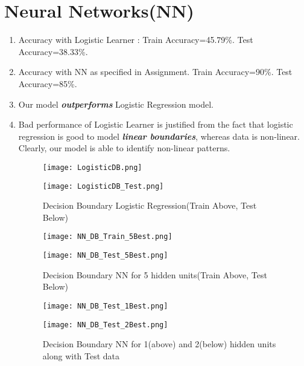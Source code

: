 \documentclass{article}
\newcommand{\italb}[1]{\textbf{\textit{#1}}}
\begin{document}
\section*{Neural Networks(NN)}
\begin{enumerate}
	\item Accuracy with Logistic Learner : Train Accuracy=45.79\%. Test Accuracy=38.33\%.
	\item Accuracy with NN as specified in Assignment. Train Accuracy=90\%. Test Accuracy=85\%.
	\item Our model \italb{outperforms} Logistic Regression model. 
	\item Bad performance of Logistic Learner is justified from the fact that logistic regression is good to model \italb{linear boundaries}, whereas data is non-linear. Clearly, our model is able to identify non-linear patterns.

\begin{figure}[h]
\vspace*{-2cm}
\hspace*{-1.5cm}
\centering
\texttt{[image: LogisticDB.png]}
\vspace*{-1.5cm}
\caption{Decision Boundary Logistic Regression(Train Above, Test Below)}
\hspace*{-1.5cm}
\centering
\texttt{[image: LogisticDB\_Test.png]}
\end{figure}

\begin{figure}[h]
\vspace*{-2cm}
\hspace*{-1.5cm}
\centering
\texttt{[image: NN\_DB\_Train\_5Best.png]}
\vspace*{-1.5cm}
\caption{Decision Boundary NN for 5 hidden units(Train Above, Test Below)}
\hspace*{-1.5cm}
\centering
\texttt{[image: NN\_DB\_Test\_5Best.png]}
\end{figure}

\begin{figure}[h]
\vspace*{-2cm}
\hspace*{-1.5cm}
\centering
\texttt{[image: NN\_DB\_Test\_1Best.png]}
\vspace*{-1.5cm}
\caption{Decision Boundary NN for 1(above) and 2(below) hidden units along with Test data}
\hspace*{-1.5cm}
\centering
\texttt{[image: NN\_DB\_Test\_2Best.png]}
\end{figure}


\end{enumerate}
\end{document}
